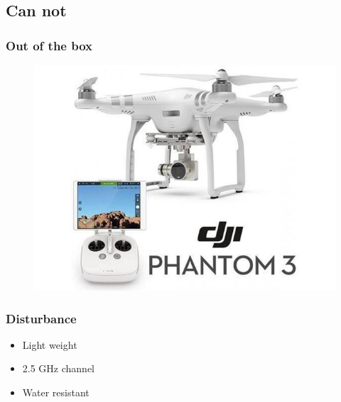 \subsection{Can not}

\begin{frame}
\frametitle{Out of the box}

  \begin{figure}
  \includegraphics[scale=0.5]{pic/03_our-copter/phantom3.jpg}
  \end{figure}
  
\end{frame}



\begin{frame}
\frametitle{Disturbance}

  \begin{itemize}
    \item Light weight
    \item 2.5 GHz channel
	\item Water resistant
  \end{itemize}
    
\end{frame}



